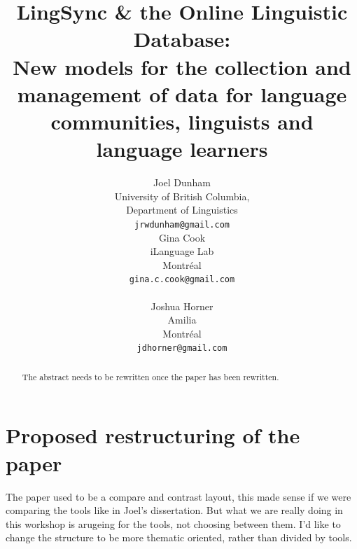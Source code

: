 \documentclass[11pt]{article}
\title{LingSync \& the Online Linguistic Database:\\New models for the
    collection and management of data for language communities, linguists and
language learners}
\author{Joel Dunham \\
University of British Columbia,   \\
Department of Linguistics \\
{\tt jrwdunham@gmail.com} \\\And
Gina Cook \\
iLanguage Lab \\
Montr\'eal \\
{\tt gina.c.cook@gmail.com} \\  \\\And
Joshua Horner \\
Amilia  \\
Montr\'eal \\
{\tt jdhorner@gmail.com} \\ }
\date{}
\begin{document}
\maketitle
\tableofcontents

\begin{abstract}
The abstract needs to be rewritten once the paper has been rewritten.
\end{abstract}

\section*{Proposed restructuring of the paper}

The paper used to be a compare and contrast layout, this made sense if we were comparing the tools like in Joel's dissertation. But what we are really doing in this workshop is arugeing for the tools, not choosing between them. I'd like to change the structure to be more thematic oriented, rather than divided by tools.
\end{document}
